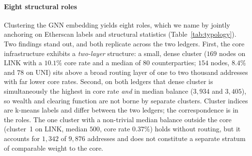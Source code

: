 \documentclass[final,5p,times]{elsarticle}
\begin{document}
\paragraph{Eight structural roles}
Clustering the GNN embedding yields eight roles, which we name by jointly
anchoring on Etherscan labels and structural statistics
(Table~\ref{tab:typology}). Two findings stand out, and both replicate
across the two ledgers. First, the core infrastructure exhibits a
\emph{two-layer} structure: a small, dense cluster ($169$ nodes on LINK with
a $10.1\%$ core rate and a median of $80$ counterparties; $154$ nodes,
$8.4\%$ and $78$ on UNI) sits above a broad routing layer of one to two
thousand addresses with far lower core rates. Second, on both ledgers that
dense cluster is simultaneously the highest in core rate \emph{and} in median
balance ($3{,}934$ and $3{,}405$), so wealth and clearing function are not
borne by separate clusters. Cluster indices are k-means
labels and differ between the two ledgers; the correspondence is in the roles.
The one cluster with a non-trivial median balance outside the core
(cluster~1 on LINK, median $500$, core rate $0.37\%$) holds without routing,
but it accounts for $1{,}342$ of $9{,}876$ addresses and does not constitute
a separate stratum of comparable weight to the core.
\end{document}
